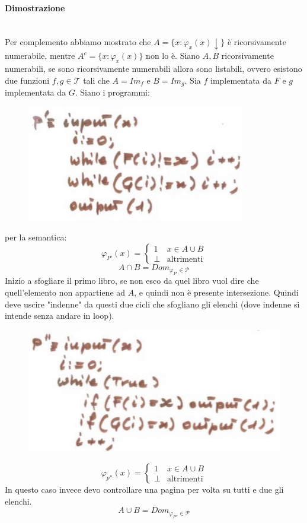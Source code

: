 \documentclass{article}
\begin{document}
\paragraph{Dimostrazione}\mbox{}\\
Per complemento abbiamo mostrato che $A=\{x:\varphi_x(x)\downarrow\}$ è ricorsivamente
numerabile, mentre $A^c=\{x:\varphi_x(x)\}$ non lo è. Siano $A,B$ ricorsivamente numerabili,
se sono ricorsivamente numerabili allora sono listabili, ovvero esistono due funzioni $f,g\in\mathcal{T}$
tali che $A=Im_f$ e $B=Im_g$. Sia $f$ implementata da $F$ e $g$ implementata da $G$. Siano i programmi:
\begin{figure}[H]
    \centering
    \includegraphics[scale=0.6]{images/inters_AB.png}
\end{figure}
per la semantica:
\[
    \varphi_{P'}(x)=
    \begin{cases}
        1    & x\in A\cup B      \\
        \bot & \text{altrimenti}
    \end{cases}
\]
$$A\cap B = Dom_{\varphi_{P'}\in\mathcal{P}}$$
Inizio a sfogliare il primo libro, se non esco da quel libro vuol dire che quell'elemento
non appartiene ad $A$, e quindi non è presente intersezione. Quindi deve uscire "indenne"
da questi due cicli che sfogliano gli elenchi (dove indenne si intende senza andare in loop).

\begin{figure}[H]
    \centering
    \includegraphics[scale=0.6]{images/unionie_AB.png}
\end{figure}
\[
    \varphi_{p''}(x)=
    \begin{cases}
        1    & x\in A\cup B      \\
        \bot & \text{altrimenti}
    \end{cases}
\]
In questo caso invece devo controllare una pagina per volta su tutti e due gli elenchi.
$$A\cup B=Dom_{\varphi_{P''}\in\mathcal{P}}$$
\end{document}
